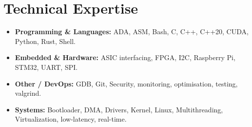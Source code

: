 \documentclass[9pt,a4paper]{article}
\begin{document}
\section*{Technical Expertise}
\begin{tcolorbox}[mybox]
\begin{itemize}
\item \textbf{Programming \& Languages:} ADA, ASM, Bash, C, C++, C++20, CUDA, Python, Rust, Shell.

\item \textbf{Embedded \& Hardware:} ASIC interfacing, FPGA, I2C, Raspberry Pi, STM32, UART, SPI.

\item \textbf{Other / DevOps:} GDB, Git, Security, monitoring, optimisation, testing, valgrind.

\item \textbf{Systems:} Bootloader, DMA, Drivers, Kernel, Linux, Multithreading, Virtualization, low-latency, real-time.
\end{itemize}
\end{tcolorbox}
\end{document}
